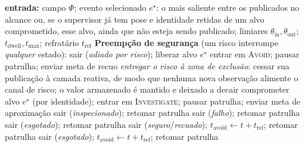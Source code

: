 \begin{algorithm}[htb]
\caption{Camada reativa \textsc{Stay Alert} (por ciclo de controle)}
\label{alg:stayalert}
\begin{algorithmic}[1]
\STATE \textbf{entrada:} campo $\Phi$; evento selecionado $e^\star$: o mais
       saliente entre os publicados no alcance ou, se o supervisor já tem pose e
       identidade retidas de um alvo comprometido, esse alvo, ainda que não esteja
       sendo publicado; limiares $\theta_{\text{in}},\theta_{\text{out}}$;
       $t_{\text{dwell}}, t_{\max}$; refratário $t_{\text{ref}}$
\STATE \textbf{Preempção de segurança} (um risco interrompe \emph{qualquer} estado):
     \STATE sair (\emph{adiado por risco}); liberar alvo $e^\star$
  \ENDIF
  \STATE entrar em \textsc{Avoid}; pausar patrulha; enviar meta de recuo
     \STATE \emph{entregar o risco à zona de exclusão}: cessar sua publicação à
            camada reativa, de modo que nenhuma nova observação alimente o canal de
            risco; o valor armazenado é mantido e deixado a decair
  \ENDIF
{}
     \STATE comprometer alvo $e^\star$ (por identidade); entrar em
            \textsc{Investigate}; pausar patrulha; enviar meta de aproximação
  \ENDIF
{}
     \STATE sair (\emph{inspecionado}); retomar patrulha
     \STATE sair (\emph{falho}); retomar patrulha 
     \STATE sair (\emph{esgotado}); retomar patrulha
  \ENDIF
{}
     \STATE sair (\emph{seguro}/\emph{recuado});
            $t_{\text{avoid}} \gets t + t_{\text{ref}}$; retomar patrulha
     \STATE sair (\emph{esgotado});
            $t_{\text{avoid}} \gets t + t_{\text{ref}}$; retomar patrulha
  \ENDIF
\ENDIF
\end{algorithmic}
\end{algorithm}

